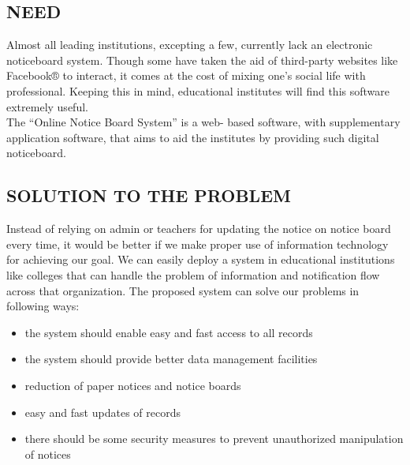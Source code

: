 \documentclass[12pt,a4paper]{article}
\begin{document}
	\subsection{NEED}
	Almost all leading institutions, excepting a few, currently lack an electronic noticeboard system. Though some have taken the aid of third-party websites like Facebook® to interact, it comes at the cost of mixing one’s social life with professional. Keeping this in mind, educational institutes will find this software extremely useful.\\
	The “Online Notice Board System” is a web- based software, with supplementary application software, that aims to aid the institutes by providing such digital noticeboard.\\
	
	\subsection{SOLUTION TO THE PROBLEM}
	Instead of relying on admin or teachers for updating the notice on notice board every time, it would be better if we make proper use of information technology for achieving our goal. We can easily deploy a system in educational institutions like colleges that can handle the problem of information and notification flow across that organization. The proposed system can solve our problems in following ways:
	\begin{itemize}
	    \item the system should enable easy and fast access to all records
	    \item the system should provide better data management facilities
	    \item reduction of paper notices and notice boards
	    \item easy and fast updates of records
	    \item there should be some security measures to prevent unauthorized manipulation of notices\\
	\end{itemize}
	
\end{document}
